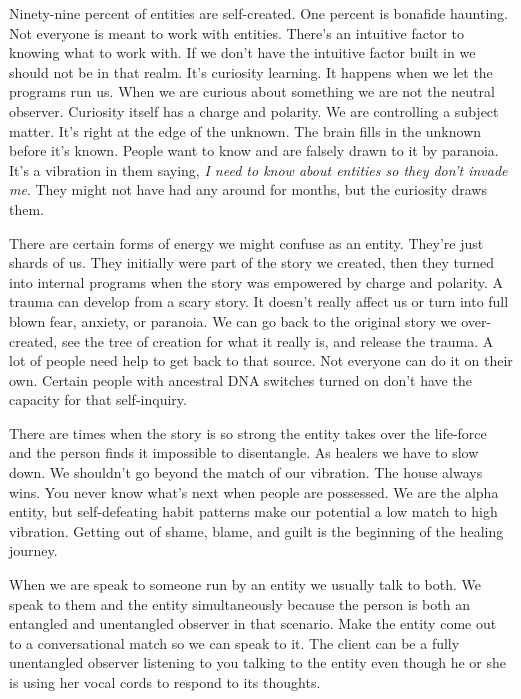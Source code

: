 Ninety-nine percent of entities are self-created. One percent is
bonafide haunting. Not everyone is meant to work with entities. There's
an intuitive factor to knowing what to work with. If we don't have the
intuitive factor built in we should not be in that realm. It's curiosity
learning. It happens when we let the programs run us. When we are
curious about something we are not the neutral observer. Curiosity
itself has a charge and polarity. We are controlling a subject matter.
It's right at the edge of the unknown. The brain fills in the unknown
before it's known. People want to know and are falsely drawn to it by
paranoia. It's a vibration in them saying, \emph{I need to know about
entities so they don't invade me}. They might not have had any around
for months, but the curiosity draws them.

There are certain forms of energy we might confuse as an entity. They're
just shards of us. They initially were part of the story we created,
then they turned into internal programs when the story was empowered by
charge and polarity. A trauma can develop from a scary story. It doesn't
really affect us or turn into full blown fear, anxiety, or paranoia. We
can go back to the original story we over-created, see the tree of
creation for what it really is, and release the trauma. A lot of people
need help to get back to that source. Not everyone can do it on their
own. Certain people with ancestral DNA switches turned on don't have the
capacity for that self-inquiry.

There are times when the story is so strong the entity takes over the
life-force and the person finds it impossible to disentangle. As healers
we have to slow down. We shouldn't go beyond the match of our vibration.
The house always wins. You never know what's next when people are
possessed. We are the alpha entity, but self-defeating habit patterns
make our potential a low match to high vibration. Getting out of shame,
blame, and guilt is the beginning of the healing journey.

When we are speak to someone run by an entity we usually talk to both.
We speak to them and the entity simultaneously because the person is
both an entangled and unentangled observer in that scenario. Make the
entity come out to a conversational match so we can speak to it. The
client can be a fully unentangled observer listening to you talking to
the entity even though he or she is using her vocal cords to respond to
its thoughts.

